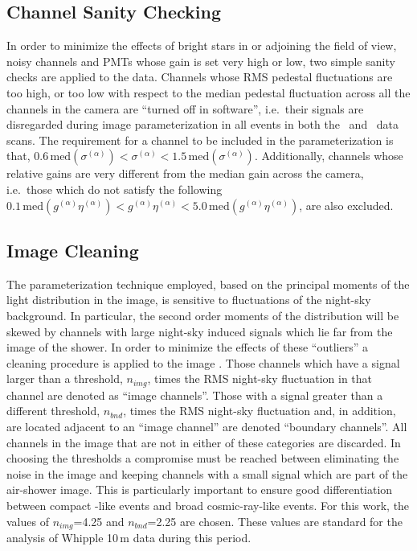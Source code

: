 \subsection{Channel Sanity Checking}
\label{SUBSEC::ANALYSIS::SANITY}

In order to minimize the effects of bright stars in or adjoining the
field of view, noisy channels and PMTs whose gain is set very high or
low, two simple sanity checks are applied to the data. Channels whose
RMS pedestal fluctuations are too high, or too low with respect to the
median pedestal fluctuation across all the channels in the camera are
``turned off in software'', i.e.\ their signals are disregarded during
image parameterization in all events in both the \On\ and \Off\ data
scans.  The requirement for a channel to be included in the
parameterization is that, $0.6\,\mathrm{med}(\sigma^{(\alpha)}) <
\sigma^{(\alpha)} < 1.5\,\mathrm{med}(\sigma^{(\alpha)})$. Additionally, 
channels whose relative gains are very different from the median gain
across the camera, i.e.\ those which do not satisfy the following
$0.1\,\mathrm{med}(g^{(\alpha)}\eta^{(\alpha)}) < 
g^{(\alpha)}\eta^{(\alpha)} < 
5.0\,\mathrm{med}(g^{(\alpha)}\eta^{(\alpha)})$, are also excluded.

\subsection{Image Cleaning}
\label{SUBSEC::ANALYSIS::CLEANING}

The parameterization technique employed, based on the principal
moments of the light distribution in the image, is sensitive to
fluctuations of the night-sky background. In particular, the second
order moments of the distribution will be skewed by channels with
large night-sky induced signals which lie far from the image of the
shower. In order to minimize the effects of these ``outliers'' a
cleaning procedure is applied to the image
\citep{REF::FEGAN::SSR1996}. Those channels which have a signal
larger than a threshold, $n_{img}$, times the RMS night-sky
fluctuation in that channel are denoted as ``image channels''. Those
with a signal greater than a different threshold, $n_{bnd}$, times the
RMS night-sky fluctuation and, in addition, are located adjacent to an
``image channel'' are denoted ``boundary channels''. All channels in
the image that are not in either of these categories are discarded. In
choosing the thresholds a compromise must be reached between
eliminating the noise in the image and keeping channels with a small
signal which are part of the air-shower image. This is particularly
important to ensure good differentiation between compact \Grayc-like
events and broad cosmic-ray-like events. For this work, the values of
$n_{img}$=4.25 and $n_{bnd}$=2.25 are chosen. These values are
standard for the analysis of Whipple 10\,m data during this period.

